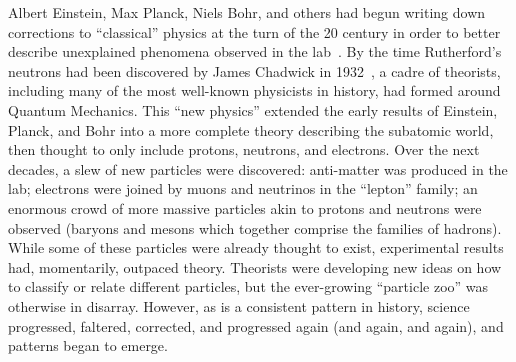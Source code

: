 \begin{dissertationintroduction}
Albert Einstein, Max Planck, Niels Bohr, and others had begun writing down corrections to ``classical'' physics at the turn of the 20 century in order to better describe unexplained phenomena observed in the lab~\cite{EinsteinPhotoelectric, Planck, Bohr}. 
By the time Rutherford's neutrons had been discovered by James Chadwick in 1932~\cite{Chadwick1932}, a cadre of theorists, including many of the most well-known physicists in history\footnotemark{}, had formed around Quantum Mechanics.
This ``new physics'' extended the early results of Einstein, Planck, and Bohr into a more complete theory describing the subatomic world, then thought to only include protons, neutrons, and electrons. 
Over the next decades, a slew of new particles were discovered: 
anti-matter was produced in the lab; 
electrons were joined by muons and neutrinos in the ``lepton'' family; 
an enormous crowd of more massive particles akin to protons and neutrons were observed (baryons and mesons which together comprise the families of hadrons). 
While some of these particles were already thought to exist, experimental results had, momentarily, outpaced theory. 
Theorists were developing new ideas on how to classify or relate different particles, but the ever-growing ``particle zoo'' was otherwise in disarray. 
However, as is a consistent pattern in history, science progressed, faltered, corrected, and progressed again (and again, and again), and patterns began to emerge. 


\end{dissertationintroduction}
